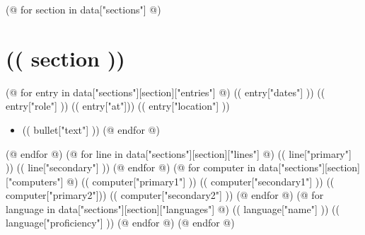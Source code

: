 \documentclass[10pt,color,letterpaper,sans]{moderncv}
\begin{document}
\maketitle

(@ for section in data["sections"] @)
  \section{(( section ))}
  (@ for entry in data["sections"][section]["entries"] @)
    \cventry
      {(( entry["dates"] ))}
      {(( entry["role"] ))}
      {(( entry["at"])) }
      {(( entry["location"] ))}
      {}
      {
        \begin{itemize}
        (@ for bullet in entry["bullets"] @) \item (( bullet["text"] )) (@ endfor @)
        \end{itemize}
      }
  (@ endfor @)
  (@ for line in data["sections"][section]["lines"] @)
    \cvline
      {(( line["primary"] ))}
      {(( line["secondary"] ))}
  (@ endfor @)
  (@ for computer in data["sections"][section]["computers"] @)
    \cvcomputer
      {(( computer["primary1"] ))}
      {(( computer["secondary1"] ))}
      {(( computer["primary2"])) }
      {(( computer["secondary2"] ))}
  (@ endfor @)
  (@ for language in data["sections"][section]["languages"] @)
    \cvlanguage
      {(( language["name"] ))}
      {(( language["proficiency"] ))}
      {}
  (@ endfor @)
(@ endfor @)
\end{document}
